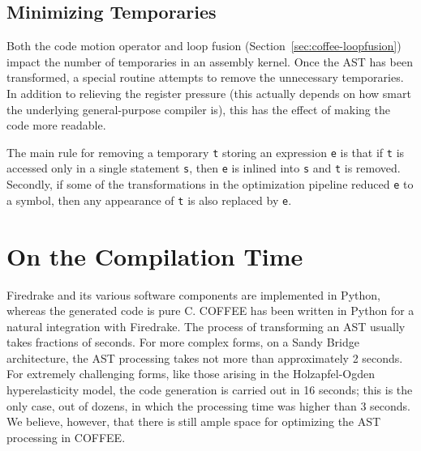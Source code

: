\subsection{Minimizing Temporaries}
Both the code motion operator and loop fusion (Section~\ref{sec:coffee-loopfusion}) impact the number of temporaries in an assembly kernel. Once the AST has been transformed, a special routine attempts to remove the unnecessary temporaries. In addition to relieving the register pressure (this actually depends on how smart the underlying general-purpose compiler is), this has the effect of making the code more readable.

The main rule for removing a temporary \texttt{t} storing an expression \texttt{e} is that if \texttt{t} is accessed only in a single statement \texttt{s}, then \texttt{e} is inlined into \texttt{s} and \texttt{t} is removed. Secondly, if some of the transformations in the optimization pipeline reduced \texttt{e} to a symbol, then any appearance of \texttt{t} is also replaced by \texttt{e}.

\section{On the Compilation Time}
Firedrake and its various software components are implemented in Python, whereas the generated code is pure C. COFFEE has been written in Python for a natural integration with Firedrake. The process of transforming an AST usually takes fractions of seconds. For more complex forms, on a Sandy Bridge architecture, the AST processing takes not more than approximately 2 seconds. For extremely challenging forms, like those arising in the Holzapfel-Ogden hyperelasticity model, the code generation is carried out in 16 seconds; this is the only case, out of dozens, in which the processing time was higher than 3 seconds. We believe, however, that there is still ample space for optimizing the AST processing in COFFEE.
